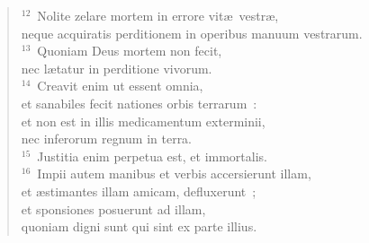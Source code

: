 \begin{verse}${}^{12}$~Nolite zelare mortem in errore vit\ae\ vestr\ae ,\\ neque acquiratis perditionem in operibus manuum vestrarum.\\
${}^{13}$~Quoniam Deus mortem non fecit,\\ nec l\ae tatur in perditione vivorum.\\
${}^{14}$~Creavit enim ut essent omnia,\\ et sanabiles fecit nationes orbis terrarum~:\\ et non est in illis medicamentum exterminii,\\ nec inferorum regnum in terra.\\
${}^{15}$~Justitia enim perpetua est, et immortalis.\\
${}^{16}$~Impii autem manibus et verbis accersierunt illam,\\ et \ae stimantes illam amicam, defluxerunt~;\\ et sponsiones posuerunt ad illam,\\ quoniam digni sunt qui sint ex parte illius.\end{verse}



